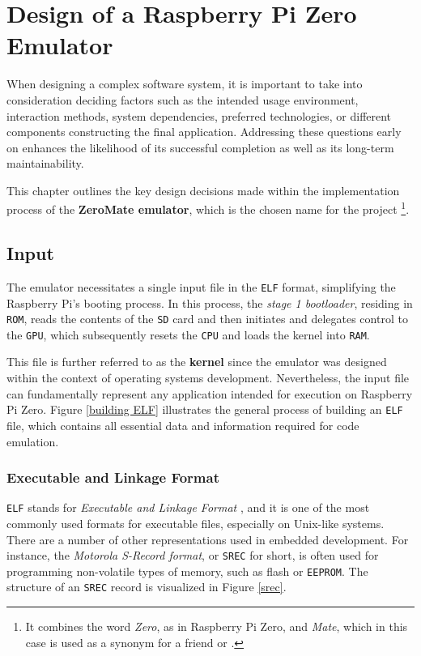 \documentclass[english, ing, kiv, he, iso690numb, pdf]{fasthesis}
\begin{document}
	\chapter{Design of a Raspberry Pi Zero Emulator} \label{Design of a Raspberry Pi Zero Emulator}
	When designing a complex software system, it is important to take into consideration deciding factors such as the intended usage environment, interaction methods, system dependencies, preferred technologies, or different components constructing the final application. Addressing these questions early on enhances the likelihood of its successful completion as well as its long-term maintainability.
	
	This chapter outlines the key design decisions made within the implementation process of the \textbf{ZeroMate emulator}, which is the chosen name for the project \footnote{It combines the word \emph{Zero}, as in Raspberry Pi Zero, and \emph{Mate}, which in this case is used as a synonym for a friend or .}.
	
	\section{Input} \label{Input}
	
	The emulator necessitates a single input file in the \texttt{ELF} format, simplifying the Raspberry Pi's booting process. In this process, the \textit{stage 1 bootloader}, residing in \texttt{ROM}, reads the contents of the \texttt{SD} card and then initiates and delegates control to the \texttt{GPU}, which subsequently resets the \texttt{CPU} and loads the kernel into \texttt{RAM}.
	
	This file is further referred to as the \textbf{kernel} since the emulator was designed within the context of operating systems development. Nevertheless, the input file can fundamentally represent any application intended for execution on Raspberry Pi Zero. Figure \ref{building ELF} illustrates the general process of building an \texttt{ELF} file, which contains all essential data and information required for code emulation.
	
	\subsection{Executable and Linkage Format}
	
	\texttt{ELF} stands for \emph{Executable and Linkage Format} \cite{ELF}, and it is one of the most commonly used formats for executable files, especially on Unix-like systems. There are a number of other representations used in embedded development. For instance, the \emph{Motorola S-Record format}, or \texttt{SREC} for short, is often used for programming non-volatile types of memory, such as flash or \texttt{EEPROM}. The structure of an \texttt{SREC} record is visualized in Figure \ref{srec}.
	
\end{document}
